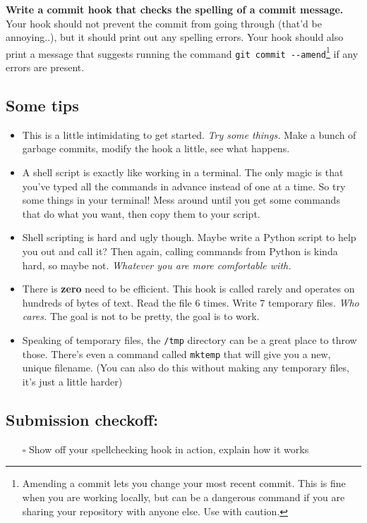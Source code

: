 \documentclass{article}
\begin{document}
\medskip
\noindent
\textbf{Write a commit hook that checks the spelling of a commit message.}
Your hook should not prevent the commit from going through (that'd be
annoying..), but it should print out any spelling errors. Your hook should
also print a message that suggests running the command
\texttt{git~commit~-{}-amend}\footnote{%
  Amending a commit lets you change your most recent commit. This is fine when
  you are working locally, but can be a dangerous command if you are sharing
  your repository with anyone else. Use with caution.
} if any errors are present.

\medskip

\subsection*{Some tips}
\begin{itemize}
  \item This is a little intimidating to get started. \emph{Try some things.}
    Make a bunch of garbage commits, modify the hook a little, see what
    happens.
  \item A shell script is exactly like working in a terminal. The only magic
    is that you've typed all the commands in advance instead of one at a time.
    So try some things in your terminal! Mess around until you get some
    commands that do what you want, then copy them to your script.
  \item Shell scripting is hard and ugly though. Maybe write a Python script
    to help you out and call it? Then again, calling commands from Python is
    kinda hard, so maybe not. \emph{Whatever you are more comfortable with.}
  \item There is \textbf{zero} need to be efficient. This hook is called
    rarely and operates on hundreds of bytes of text. Read the file 6 times.
    Write 7 temporary files. \emph{Who cares.} The goal is not to be pretty,
    the goal is to work.
  \item Speaking of temporary files, the \texttt{/tmp} directory can be a
    great place to throw those. There's even a command called \texttt{mktemp}
    that will give you a new, unique filename. (You can also do this without
    making any temporary files, it's just a little harder)
\end{itemize}

\subsection*{Submission checkoff:}
\begin{itemize}
  \item[$\square$] Show off your spellchecking hook in action, explain how it
    works
\end{itemize}
\end{document}
